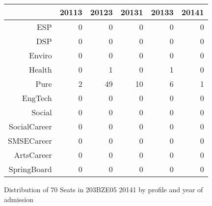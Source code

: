\documentclass{article}\usepackage[]{graphicx}\usepackage[]{color}
\begin{document}
\begin{figure}[H]
\centering
\begin{tabular}{rrrrrr}
  \hline
 & 20113 & 20123 & 20131 & 20133 & 20141 \\ 
  \hline
ESP &   0 &   0 &   0 &   0 &   0 \\ 
  DSP &   0 &   0 &   0 &   0 &   0 \\ 
  Enviro &   0 &   0 &   0 &   0 &   0 \\ 
  Health &   0 &   1 &   0 &   1 &   0 \\ 
  Pure &   2 &  49 &  10 &   6 &   1 \\ 
  EngTech &   0 &   0 &   0 &   0 &   0 \\ 
  Social &   0 &   0 &   0 &   0 &   0 \\ 
  SocialCareer &   0 &   0 &   0 &   0 &   0 \\ 
  SMSECareer &   0 &   0 &   0 &   0 &   0 \\ 
  ArtsCareer &   0 &   0 &   0 &   0 &   0 \\ 
  SpringBoard &   0 &   0 &   0 &   0 &   0 \\ 
   \hline
\end{tabular}
\caption{Distribution of 70 Seats in 203BZE05 20141 by profile and year of admission} 
\end{figure}
\end{document}

